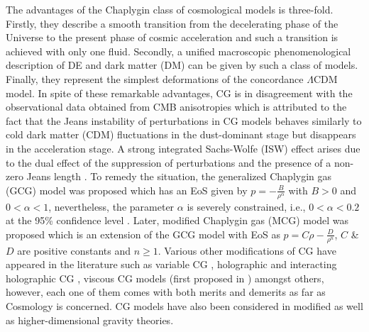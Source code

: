 \documentclass[two-column, nofootinbib]{revtex4-1}
\begin{document}
The advantages \cite{Kamenshchik1,Gorini1} of the Chaplygin class of cosmological models is three-fold. Firstly, they describe a smooth transition from the decelerating phase of the Universe to the present phase of cosmic acceleration and such a transition is achieved with only one fluid. Secondly, a unified macroscopic phenomenological description of DE and dark matter (DM) can be given by such a class of models. Finally, they represent the simplest deformations of the concordance $\Lambda$CDM model. In spite of these remarkable advantages, CG is in disagreement with the observational data obtained from CMB anisotropies \cite{Bento1,Bilic2,Amendola1} which is attributed to the fact that the Jeans instability of perturbations in CG models behaves similarly to cold dark matter (CDM) fluctuations in the dust-dominant stage but disappears in the acceleration stage. A strong integrated Sachs-Wolfe (ISW) effect arises due to the dual effect of the suppression of perturbations and the presence of a non-zero Jeans length \cite{Copeland1,Zimdahl1}. To remedy the situation, the generalized Chaplygin gas (GCG) model was proposed \cite{Bento1} which has an EoS given by $p=-\frac{B}{\rho ^\alpha}$ with $B>0$ and $0<\alpha <1$, nevertheless, the parameter $\alpha$ is severely constrained, i.e., $0<\alpha <0.2$ at the 95\% confidence level \cite{Bilic1}. Later, modified Chaplygin gas (MCG) model was proposed \cite{Benaoum1} which is an extension of the GCG model with EoS as $p=C\rho-\frac{D}{\rho ^n}$, $C$ \& $D$ are positive constants and $n \geq 1$. Various other modifications of CG have appeared in the literature such as variable CG \cite{Guo1}, holographic and interacting holographic CG \cite{Setare1,Setare2}, viscous CG models (first proposed in \cite{Zhai1}) amongst others, however, each one of them comes with both merits and demerits as far as Cosmology is concerned. CG models have also been considered in modified as well as higher-dimensional gravity theories. 
\end{document}
